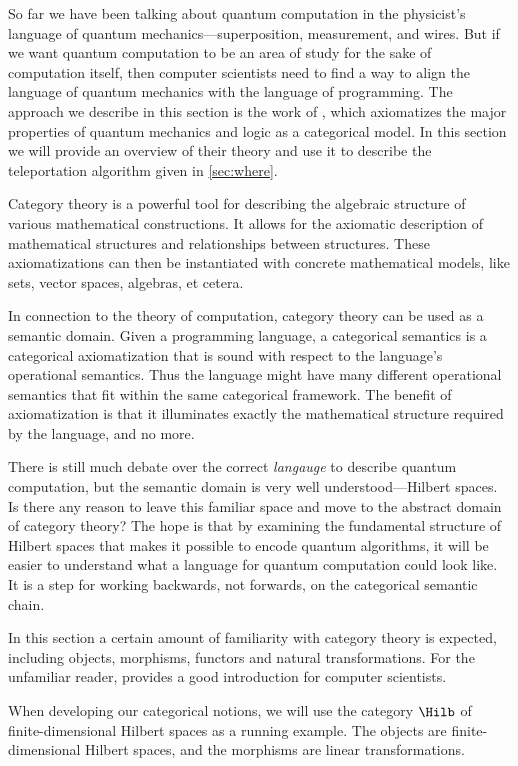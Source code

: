So far we have been talking about quantum computation in the physicist's language
of quantum mechanics---superposition, measurement, and wires. 
But if we want quantum computation to be an area of study for the sake of
computation itself, then computer scientists need to find a way to align
the language of quantum mechanics with the language of programming.
The approach we describe in this section is the work of \cite{abramsky2009categorical},
which axiomatizes the major properties of quantum mechanics and logic as a categorical model.
In this section we will provide an overview of their theory and use it to describe the
teleportation algorithm given in \cref{sec:where}.

Category theory is a powerful tool for describing the algebraic structure of
various mathematical constructions. It allows for the axiomatic description
of mathematical structures and relationships between structures. These axiomatizations
can then be instantiated with concrete mathematical models, like sets,
vector spaces, algebras, et cetera. 

In connection to the theory of computation, category theory can be used as a semantic
domain. Given a programming language, a categorical semantics is a categorical axiomatization
that is sound with respect to the language's operational semantics. 
Thus the language might have many different operational semantics that fit within the same
categorical framework. 
The benefit of axiomatization is that it illuminates exactly the mathematical structure
required by the language, and no more.

There is still much debate over the correct \emph{langauge} to describe quantum computation,
but the semantic domain is very well understood---Hilbert spaces.
Is there any reason to leave this familiar space and move to the abstract domain of category theory?
The hope is that by examining the fundamental structure of Hilbert spaces that makes it possible
to encode quantum algorithms, it will be easier to understand what a language for
quantum computation could look like. It is a step for working backwards, not forwards,
on the categorical semantic chain.

In this section a certain amount of familiarity with category theory is expected,
including objects, morphisms, functors and natural transformations. 
For the unfamiliar reader, \cite{pierce1991basic} provides a good introduction for
computer scientists.

When developing our categorical notions, we will use the category $\Hilb$ of finite-dimensional
Hilbert spaces as a running example. The objects are finite-dimensional Hilbert spaces,
and the morphisms are linear transformations. 

